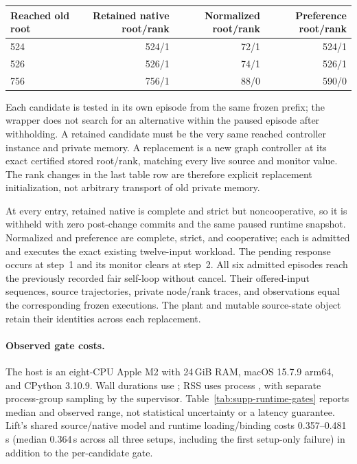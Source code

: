 \begin{center}\small
\begin{tabular}{@{}lrrr@{}}\toprule
Reached old root & Retained native root/rank & Normalized root/rank & Preference root/rank\\\midrule
524 & 524/1 & 72/1 & 524/1\\
526 & 526/1 & 74/1 & 526/1\\
756 & 756/1 & 88/0 & 590/0\\\bottomrule
\end{tabular}
\end{center}
Each candidate is tested in its own episode from the same frozen prefix;
the wrapper does not search for an alternative within the paused episode
after withholding. A retained candidate must be the very same reached
controller instance and private memory. A replacement is a new graph
controller at its exact certified stored root/rank, matching every live
source and monitor value. The rank changes in the last table row are
therefore explicit replacement initialization, not arbitrary transport
of old private memory.

At every entry, retained native is complete and strict but
noncooperative, so it is withheld with zero post-change commits and the
same paused runtime snapshot. Normalized and preference are complete,
strict, and cooperative; each is admitted and executes the exact existing
twelve-input workload. The pending response occurs at step~1 and its
monitor clears at step~2. All six admitted episodes reach the previously
recorded fair self-loop without cancel. Their offered-input sequences,
source trajectories, private node/rank traces, and observations equal the
corresponding frozen executions. The plant and mutable source-state
object retain their identities across each replacement.

\paragraph{Observed gate costs.}
The host is an eight-CPU Apple M2 with 24\,GiB RAM, macOS 15.7.9 arm64,
and CPython 3.10.9. Wall durations use ; RSS uses
process , with separate process-group sampling by the
supervisor. Table~\ref{tab:supp-runtime-gates} reports median and observed
range, not statistical uncertainty or a latency guarantee. Lift's shared
source/native model and runtime loading/binding costs
0.357--0.481\,s (median 0.364\,s across all three setups, including the
first setup-only failure) in addition to the per-candidate gate.

